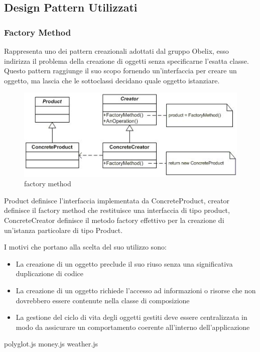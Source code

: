 \subsection{Design Pattern Utilizzati}

\subsubsection{Factory Method}
Rappresenta uno dei pattern creazionali adottati dal gruppo Obelix, esso  indirizza il problema della creazione di oggetti senza specificarne l'esatta classe. Questo pattern raggiunge il suo scopo fornendo un'interfaccia per creare un oggetto, ma lascia che le sottoclassi decidano quale oggetto istanziare.

	\FloatBarrier
	\begin{figure}[ht]
		\centering
		\includegraphics[scale=0.45]{img/method.jpg}
		\caption{factory method}
	\end{figure}


Product definisce l'interfaccia implementata da ConcreteProduct, creator definisce il factory method che restituisce una interfaccia di tipo product, ConcreteCreator definisce il metodo factory effettivo per la creazione di un’istanza particolare di tipo Product.


I motivi che portano alla scelta del suo utilizzo sono:

\begin{itemize}
\item La creazione di un oggetto preclude il suo riuso senza una significativa duplicazione di codice
\item  La creazione di un oggetto richiede l'accesso ad informazioni o risorse che non dovrebbero essere contenute nella classe di composizione
\item La gestione del ciclo di vita degli oggetti gestiti deve essere centralizzata in modo da assicurare un comportamento coerente all'interno dell'applicazione

\end{itemize}


polyglot.js
money.js
weather.js
























